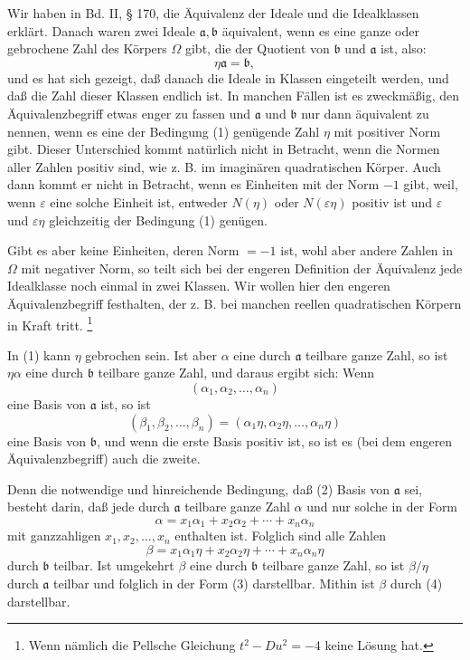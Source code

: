 \documentclass[11pt]{article}
\begin{document}
Wir haben in Bd. II, § 170, die Äquivalenz der Ideale und die Idealklassen erklärt. Danach waren zwei Ideale $\mathfrak a,\mathfrak b$ äquivalent, wenn es eine ganze oder gebrochene Zahl des Körpers $\Omega$ gibt, die der Quotient von $\mathfrak b$ und $\mathfrak a$ ist, also:
\begin{equation}
 \eta\mathfrak a=\mathfrak b,\tag{1}
\end{equation}
und es hat sich gezeigt, daß danach die Ideale in Klassen eingeteilt werden, und daß die Zahl dieser Klassen endlich ist. In manchen Fällen ist es zweckmäßig, den Äquivalenzbegriff etwas enger zu fassen und $\mathfrak a$ und $\mathfrak b$ nur dann äquivalent zu nennen, wenn es eine der Bedingung (1) genügende Zahl $\eta$ mit positiver Norm gibt. Dieser Unterschied kommt natürlich nicht in Betracht, wenn die Normen aller Zahlen positiv sind, wie z. B. im imaginären quadratischen Körper. Auch dann kommt er nicht in Betracht, wenn es Einheiten mit der Norm $-1$ gibt, weil, wenn $\varepsilon$ eine solche Einheit ist, entweder $N(\eta)$ oder $N(\varepsilon\eta)$ positiv ist und $\varepsilon$ und $\varepsilon\eta$ gleichzeitig der Bedingung (1) genügen.

Gibt es aber keine Einheiten, deren Norm $=-1$ ist, wohl aber andere Zahlen in $\Omega$ mit negativer Norm, so teilt sich bei der engeren Definition der Äquivalenz jede Idealklasse noch einmal in zwei Klassen. Wir wollen hier den engeren Äquivalenzbegriff festhalten, der z. B. bei manchen reellen quadratischen Körpern in Kraft tritt.
\footnote{Wenn nämlich die Pellsche Gleichung $t^2-Du^2=-4$ keine Lösung hat.}

In (1) kann $\eta$ gebrochen sein. Ist aber $\alpha$ eine durch $\mathfrak a$ teilbare ganze Zahl, so ist $\eta\alpha$ eine durch $\mathfrak b$ teilbare ganze Zahl, und daraus ergibt sich: Wenn
\begin{equation}
 (\alpha_1,\alpha_2,
\ldots,\alpha_n)\tag{2}
\end{equation}
eine Basis von $\mathfrak a$ ist, so ist
\[
 (\beta_1,\beta_2,\ldots,\beta_n)=(\alpha_1\eta,\alpha_2\eta,
\ldots,\alpha_n\eta)
\]
eine Basis von $\mathfrak b$, und wenn die erste Basis positiv ist, so ist es (bei dem engeren Äquivalenzbegriff) auch die zweite.

Denn die notwendige und hinreichende Bedingung, daß (2) Basis von $\mathfrak a$ sei, besteht darin, daß jede durch $\mathfrak a$ teilbare ganze Zahl $\alpha$ und nur solche in der Form
\begin{equation}
 \alpha=x_1\alpha_1+x_2\alpha_2+\cdots+x_n\alpha_n\tag{3}
\end{equation}
mit ganzzahligen $x_1,x_2,
\ldots,x_n$ enthalten ist. Folglich sind alle Zahlen
\begin{equation}
 \beta=x_1\alpha_1\eta+x_2\alpha_2\eta+\cdots+x_n\alpha_n\eta\tag{4}
\end{equation}
durch $\mathfrak b$ teilbar. Ist umgekehrt $\beta$ eine durch $\mathfrak b$ teilbare ganze Zahl, so ist $\beta/\eta$ durch $\mathfrak a$ teilbar und folglich in der Form (3) darstellbar. Mithin ist $\beta$ durch (4) darstellbar.
\end{document}
